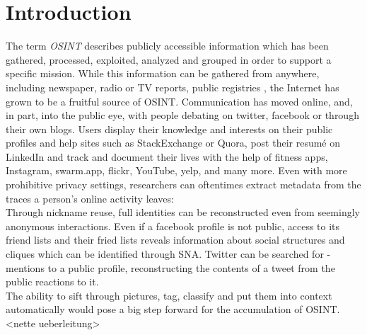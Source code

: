 \documentclass[twoside,a4paper]{article}
\title{\papertitle}
\affiliation{
\paperauthorA}
{\href{http://www.haw-hamburg.de/ti-i}{Hamburg University of Applied Sciences,
    Dept. Computer Science,} \\ Berliner Tor 7\\ 20099 Hamburg, Germany\\
{\ttfamily \href{mailto:lotte.steenbrink@haw-hamburg.de}{lotte.steenbrink@haw-hamburg.de}}
}
\newif\ifpdf
\begin{document}
\ifpdf %
  \DeclareGraphicsExtensions{.png,.jpg,.pdf}
\else  %
\fi

\maketitle

\begin{abstract}
Recognizing an categorizing objects in an image is one of the problems which are harder to solve for computers than for humans. However, image recognition is imperative to make human-computer interaction more natural and improve the way information contained in images is stored and handled. In recent years, the field has seen a lot of progress. This paper aims to provide an overview over the challenges faced by image recognition software, and available solutions as well as their limitations.
\end{abstract}


\section{Introduction}
\label{sec:intro}

The term \emph{\gls{OSINT}} describes publicly accessible information which has been gathered, processed, exploited, analyzed and grouped in order to support a specific mission.
While this information can be gathered from anywhere, including newspaper, radio or TV reports, public registries , the Internet has grown to be a fruitful source of OSINT. Communication has moved online, and, in part, into the public eye, with people debating on twitter, facebook or through their own blogs. Users display their knowledge and interests on their public profiles and help sites such as StackExchange or Quora, post their resumé on LinkedIn and track and document their lives with the help of fitness apps, Instagram, swarm.app, flickr, YouTube, yelp, and many more. Even with more prohibitive privacy settings, researchers can oftentimes extract metadata from the traces a person's online activity leaves:\\
Through nickname reuse, full identities can be reconstructed even from seemingly anonymous interactions. Even if a facebook profile is not public, access to its friend lists and their fried lists reveals information about social structures and cliques which can be identified through \gls{SNA}. Twitter can be searched for \@-mentions to a public profile, reconstructing the contents of a tweet from the public reactions to it.\\ 
The ability to sift through pictures, tag, classify and put them into context automatically would pose a big step forward for the accumulation of OSINT.
<nette ueberleitung>
\end{document}
